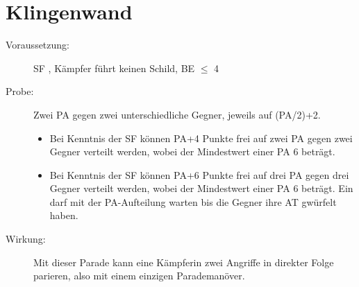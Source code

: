 \section{Klingenwand}
\label{bPA.klingenwand}
\begin{description}
    \item[Voraussetzung:] SF , Kämpfer führt keinen Schild, BE\textrm{ ${\leq}$ }4
    \item[Probe:]
        Zwei PA gegen zwei unterschiedliche Gegner, jeweils auf (PA/2)+2.
        \begin{itemize}
            \item Bei Kenntnis der SF  können PA+4 Punkte frei auf zwei PA gegen zwei Gegner verteilt werden, wobei der Mindestwert einer PA 6 beträgt.
            \item Bei Kenntnis der SF  können PA+6 Punkte frei auf drei PA gegen drei Gegner verteilt werden, wobei der Mindestwert einer PA 6 beträgt.
            Ein  darf mit der PA-Aufteilung warten bis die Gegner ihre AT gwürfelt haben.
        \end{itemize}
    \item[Wirkung:]
        Mit dieser Parade kann eine Kämpferin zwei Angriffe in direkter Folge parieren, also mit einem einzigen Parademanöver.
\end{description}
